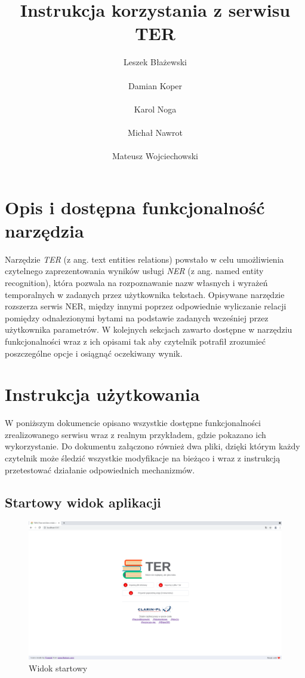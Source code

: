 \documentclass[12pt, a4paper]{article}
\title{ Instrukcja korzystania z serwisu TER}
\author{ Leszek Błażewski\\\\Damian Koper\\\\Karol Noga\\\\Michał Nawrot\\\\Mateusz Wojciechowski}
\begin{document}
\maketitle
\pagebreak

\tableofcontents
\pagebreak


\section{Opis i dostępna funkcjonalność narzędzia}

Narzędzie \textit{TER} (z ang. text entities relations) powstało w celu umożliwienia czytelnego zaprezentowania wyników usługi \textit{NER} (z ang. named entity recognition), która pozwala na rozpoznawanie nazw własnych i wyrażeń temporalnych w zadanych przez użytkownika tekstach. Opisywane narzędzie rozszerza serwis NER, między innymi poprzez odpowiednie wyliczanie relacji pomiędzy odnalezionymi bytami na podstawie zadanych wcześniej przez użytkownika parametrów. W kolejnych sekcjach zawarto dostępne w narzędziu funkcjonalności wraz z ich opisami tak aby czytelnik potrafił zrozumieć poszczególne opcje i osiągnąć oczekiwany wynik.

\section{Instrukcja użytkowania}

W poniższym dokumencie opisano wszystkie dostępne funkcjonalności zrealizowanego serwisu wraz z realnym przykładem, gdzie pokazano ich wykorzystanie. Do dokumentu załączono również dwa pliki, dzięki którym każdy czytelnik może śledzić wszystkie modyfikacje na bieżąco i wraz z instrukcją przetestować działanie odpowiednich mechanizmów.

\pagebreak

\subsection{Startowy widok aplikacji}

\begin{figure}[H]
    \centering
    \includegraphics[width=\linewidth]{images/homepage.png}
    \caption{Widok startowy}
    \label{main-view}
\end{figure}
\end{document}
